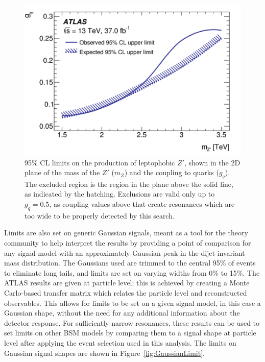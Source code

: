 \begin{figure}[]
	\centering
	\includegraphics[width=0.8\columnwidth]{figures/Results/ZPrimeLimit.png}
	\caption{95\% CL limits on the production of leptophobic $Z'$, shown in the 2D plane of the mass of the $Z'$ ($m_Z$) and the coupling to quarks ($g_q$).  The excluded region is the region in the plane above the solid line, as indicated by the hatching.  Exclusions are valid only up to $g_q=0.5$, as coupling values above that create resonances which are too wide to be properly detected by this search.}
	\label{fig:ZLimits}
\end{figure}

Limits are also set on generic Gaussian signals, meant as a tool for the theory community to help interpret the results by providing a point of comparison for any signal model with an approximately-Gaussian peak in the dijet invariant mass distribution.  The Gaussians used are trimmed to the central 95\% of events to eliminate long tails, and limits are set on varying widths from 0\% to 15\%.  The ATLAS results are given at particle level; this is achieved by creating a Monte Carlo-based transfer matrix which relates the particle level and reconstructed observables.  This allows for limits to be set on a given signal model, in this case a Gaussian shape, without the need for any additional information about the detector response.  For sufficiently narrow resonances, these results can be used to set limits on other BSM models by comparing them to a signal shape at particle level after applying the event selection used in this analysis.  The limits on Gaussian signal shapes are shown in Figure~\ref{fig:GaussianLimit}.

